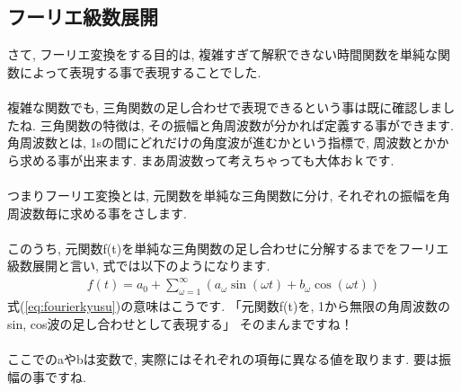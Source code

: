 \documentclass[11pt,a4paper]{jreport}
\begin{document}
\subsection{フーリエ級数展開}
さて, フーリエ変換をする目的は, 複雑すぎて解釈できない時間関数を単純な関数によって表現する事で表現することでした.\\
\\
複雑な関数でも, 三角関数の足し合わせで表現できるという事は既に確認しましたね. 三角関数の特徴は, その振幅と角周波数が分かれば定義する事ができます. \\
角周波数とは, 1sの間にどれだけの角度波が進むかという指標で, 周波数とかから求める事が出来ます. まあ周波数って考えちゃっても大体おｋです. \\
\\
つまりフーリエ変換とは, 元関数を単純な三角関数に分け, それぞれの振幅を角周波数毎に求める事をさします.\\
\\
このうち, 元関数f(t)を単純な三角関数の足し合わせに分解するまでをフーリエ級数展開と言い, 式では以下のようになります. 
\begin{eqnarray}
f(t) = a_0 + \sum_{\omega=1}^\infty {(a_\omega \sin(\omega t) + b_\omega \cos(\omega t))}
\label{eq:fourierkyusu}
\end{eqnarray}
式(\ref{eq:fourierkyusu})の意味はこうです. 「元関数f(t)を, 1から無限の角周波数のsin, cos波の足し合わせとして表現する」 そのまんまですね！\\
\\
ここでのaやbは変数で, 実際にはそれぞれの項毎に異なる値を取ります. 要は振幅の事ですね.\\
\end{document}
